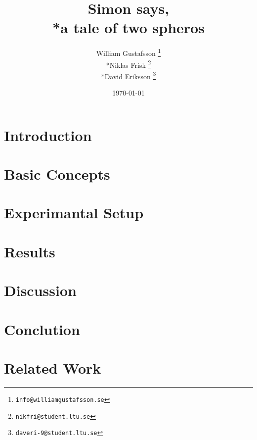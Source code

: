 \documentclass[11pt, twocolumn]{article}
\title{\textbf{Simon says, \\*a tale of two spheros}}
\author{William Gustafsson \footnote{\tt{info@williamgustafsson.se}} \\*Niklas Frisk \footnote{\tt{nikfri@student.ltu.se}} \\*David Eriksson \footnote{\tt{daveri-9@student.ltu.se}}}
\date{\today}
\begin{document}
\maketitle

\abstract

 	
 	\section{Introduction}
	
	\section{Basic Concepts}	
	
	\section{Experimantal Setup}
	
	\section{Results}
	
	\section{Discussion}
	
	\section{Conclution}
	
	\section{Related Work}
	
	
	
\end{document}
